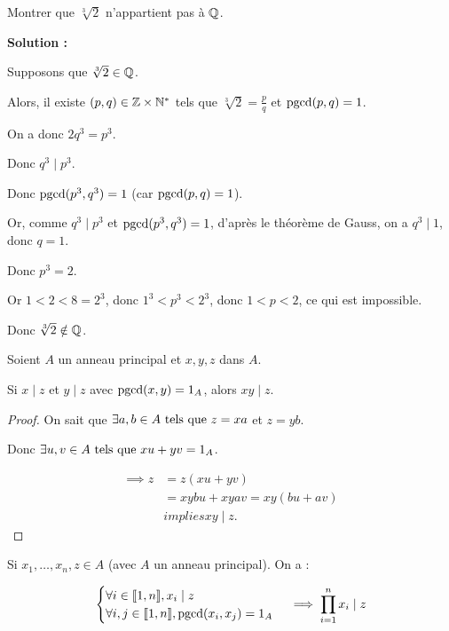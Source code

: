 \documentclass[12pt, a4paper]{report}
\begin{document}
\begin{application}
    Montrer que $\sqrt[3]{2}$ n'appartient pas à $\mathbb{Q}$.

    \textbf{Solution :}

    Supposons que $\sqrt[3]{2} \in \mathbb{Q}$. 
    
    Alors, il existe $(p,q)\in\mathbb{Z}\times\mathbb{N}^*$ tels que $\sqrt[3]{2} = \frac{p}{q}$ et $\mathrm{pgcd}(p,q) = 1$.

    On a donc $2q^3 = p^3$.

    Donc $q^3 \mid p^3$.

    Donc $\mathrm{pgcd}(p^3,q^3) = 1$ (car $\mathrm{pgcd}(p,q)=1$).

    Or, comme $q^3 \mid p^3$ et $\mathrm{pgcd}(p^3,q^3)=1$, d'après le théorème de Gauss, on a $q^3 \mid 1$, donc $q=1$.

    Donc $p^3 = 2$.

    Or $1<2<8=2^3$, donc $1^3<p^3<2^3$, donc $1<p<2$, ce qui est impossible.

    Donc $\sqrt[3]{2} \notin \mathbb{Q}$.
\end{application}

\begin{property}
    Soient $A$ un anneau principal et $x,y,z$ dans $A$.

    Si $x\mid z$ et $y\mid z$ avec $\mathrm{pgcd}(x,y)=1_A$, alors $xy \mid z$.
\end{property}

\begin{proof}
    On sait que $\exists a,b \in A \text{ tels que } z = xa$ et $z=yb$.

    Donc $\exists u,v \in A \text{ tels que } xu + yv = 1_A$.

    \begin{align*}
        \implies z &= z(xu + yv)\\
        &= xybu + xyav = xy(bu + av)\\
        &implies xy \mid z.
    \end{align*}
\end{proof}

\begin{consequence}
    Si $x_1,\dots,x_n,z \in A$ (avec $A$ un anneau principal). On a :

    $$\begin{cases}
        \forall i \in [\![1,n]\!], x_i \mid z\\
        \forall i,j \in [\![1,n]\!], \mathrm{pgcd}(x_i,x_j) = 1_A
    \end{cases} \implies \prod_{i=1}^n x_i \mid z$$
\end{consequence}
\end{document}
